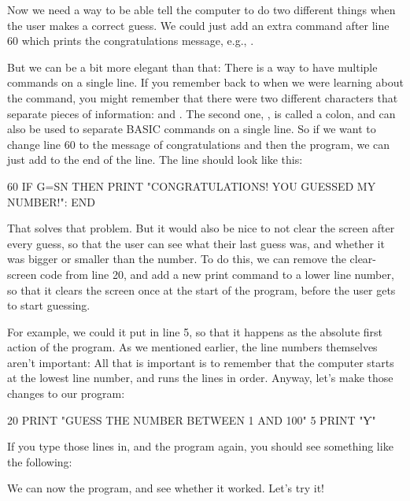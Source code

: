 Now we need a way to be able tell the computer to do two different
things when the user makes a correct guess. We could just add an extra
 command after line 60 which prints the congratulations
message, e.g., .

But we can be a bit more
elegant than that: There is a way to have multiple commands on a
single line.  If you remember back to when we were learning about the
 command, you might remember that there were two different
characters that separate pieces of information: \stw{,} and
\stw{:}. The second one, \stw{:}, is called a colon, and can also be
used to separate BASIC commands on a single line.  So if we want to
change line 60 to  the message of congratulations and then
 the program, we can just add  to the end of the
line. The line should look like this:

\begin{screencode}
  60 IF G=SN THEN PRINT "CONGRATULATIONS! YOU GUESSED MY NUMBER!": END
\end{screencode}

That solves that problem.  But it would also be nice to not clear the
screen after every guess, so that the user can see what their last
guess was, and whether it was bigger or smaller than the number.  To
do this, we can remove the clear-screen code from line 20, and add a
new print command to a lower line number, so that it clears the screen
once at the start of the program, before the user gets to start
guessing.

\needspace{2cm}
For example, we could it put in line 5, so that it happens
as the absolute first action of the program.  As we mentioned
earlier, the line numbers themselves aren't important: All that is
important is to remember that the computer starts at the lowest line
number, and runs the lines in order.  Anyway, let's make those changes
to our program:

\begin{screencode}
  20 PRINT "GUESS THE NUMBER BETWEEN 1 AND 100"
  5 PRINT "Ƴ"
\end{screencode}

\needspace{4cm}
If you type those lines in, and  the program again, you
should see something like the following:


\needspace{4cm}
We can now  the program, and see whether it worked. Let's try it!

